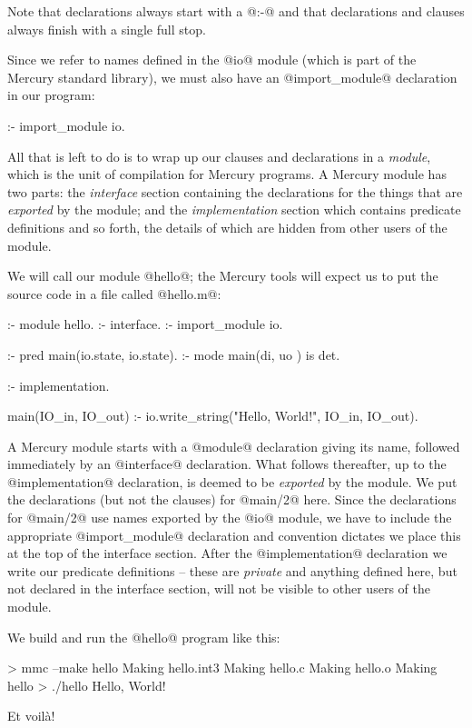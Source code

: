 Note that declarations always start with a @:-@ and that declarations
and clauses always finish with a single full stop.

Since we refer to names defined in the @io@ module (which is part of the
Mercury standard library), we must also have an @import_module@
declaration in our program:
\begin{myverbatim}
:- import_module io.
\end{myverbatim}

All that is left to do is to wrap up our clauses and declarations in a
\emph{module}, which is the unit of compilation for Mercury programs.  A
Mercury module has two parts: the \emph{interface} section containing the
declarations for the things that are \emph{exported} by the module; and the
\emph{implementation} section which contains predicate definitions and so
forth, the details of which are hidden from other users of the module.

We will call our module @hello@; the Mercury tools will expect us to put
the source code in a file called @hello.m@:
\begin{myverbatim}
:- module hello.
:- interface.
:- import_module io.

:- pred main(io.state, io.state).
:- mode main(di,       uo      ) is det.

:- implementation.

main(IO_in, IO_out) :-
    io.write_string("Hello, World!\n", IO_in, IO_out).
\end{myverbatim}
A Mercury module starts with a @module@ declaration giving its name,
followed immediately by an @interface@ declaration.  What follows
thereafter, up to the @implementation@ declaration, is deemed to be
\emph{exported} by the module.  We put the declarations (but not the
clauses) for @main/2@ here.  Since the declarations for @main/2@ use
names exported by the @io@ module, we have to include the appropriate
@import_module@ declaration and convention dictates we place this at the
top of the interface section.  After the @implementation@ declaration we
write our predicate definitions -- these are \emph{private} and anything
defined here, but not declared in the interface section, will not be
visible to other users of the module.

We build and run the @hello@ program like this:
\begin{myverbatim}
> mmc --make hello
  Making hello.int3
  Making hello.c
  Making hello.o
  Making hello
> ./hello
  Hello, World!
\end{myverbatim}
Et voil\`a!

